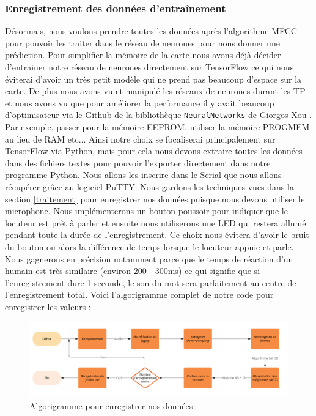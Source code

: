 \documentclass[a4paper,11pt]{article}
\begin{document}
\subsubsection{Enregistrement des données d'entraînement}

Désormais, nous voulons prendre toutes les données après l'algorithme MFCC pour pouvoir les traiter dans le réseau de neurones pour nous donner une prédiction. Pour simplifier la mémoire de la carte nous avons déjà décider d'entrainer notre réseau de neurones directement sur TensorFlow ce qui nous éviterai d'avoir un très petit modèle qui ne prend pas beaucoup d'espace sur la carte. De plus nous avons vu et manipulé les réseaux de neurones durant les TP et nous avons vu que pour améliorer la performance il y avait beaucoup d'optimisateur via le Github de la bibliothèque \href{https://github.com/GiorgosXou/NeuralNetworks}{\texttt{NeuralNetworks}} de Giorgos Xou \cite{neural}. Par exemple, passer pour la mémoire EEPROM, utiliser la mémoire PROGMEM au lieu de RAM etc... Ainsi notre choix se focaliserai principalement sur TensorFlow via Python, mais pour cela nous devons extraire toutes les données dans des fichiers textes pour pouvoir l'exporter directement dans notre programme Python. Nous allons les inscrire dans le Serial que nous allons récupérer grâce au logiciel PuTTY. Nous gardons les techniques vues dans la section \ref{traitement} pour enregistrer nos données puisque nous devons utiliser le microphone. Nous implémenterons un bouton poussoir pour indiquer que le locuteur est prêt à parler et ensuite nous utiliserons une LED qui restera allumé pendant toute la durée de l'enregistrement. Ce choix nous évitera d'avoir le bruit du bouton ou alors la différence de temps lorsque le locuteur appuie et parle. Nous gagnerons en précision notamment parce que le temps de réaction d'un humain est très similaire (environ 200 - 300ms) ce qui signifie que si l'enregistrement dure 1 seconde, le son du mot sera parfaitement au centre de l'enregistrement total. Voici l'algorigramme complet de notre code pour enregistrer les valeurs : 
\begin{figure}[H]
\centering
\includegraphics[scale=0.5]{images/algo_enregistrement.png}
\caption{Algorigramme pour enregistrer nos données} \label{fig:algo_enregistrement}
\end{figure}
\end{document}

